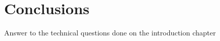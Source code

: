 \section{Conclusions}\label{sec:c_conclusions}

Answer to the technical questions done on the introduction chapter